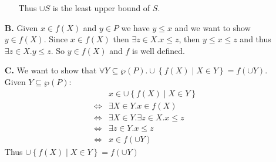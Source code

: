 \begin{exercise}
\begin{enumerate}
\begin{itemize}
                    Thus $\cup S$ is the least upper bound of $S$.
            \end{itemize}
        \item[\textbf{B.}]
            Given $x \in f(X)$ and $y \in P$ we have $y \leq x$ and we want to show $y \in f(X)$. Since $x \in f(X)$ then $\exists z \in X. x \leq z$, then $y \leq x \leq z$ and thus $\exists z \in X. y \leq z$. So $y \in f(X)$ and $f$ is well defined.
        \item[\textbf{C.}] 
            We want to show that $\forall Y \subseteq \wp(P). \cup \left\{f(X) \mid X \in Y\right\} = f(\cup Y)$. Given $Y \subseteq \wp(P)$:
            \begin{align*}
                &x \in \cup \left\{f(X) \mid X \in Y\right\} \\
                \iff& \exists X \in Y. x \in f(X) \\
                \iff& \exists X \in Y. \exists z \in X. x \leq z \\
                \iff& \exists z \in Y. x \leq z \\
                \iff& x \in f(\cup Y)
            \end{align*}
            Thus $\cup \left\{f(X) \mid X \in Y\right\} = f(\cup Y)$
    \end{enumerate}
\end{exercise}

